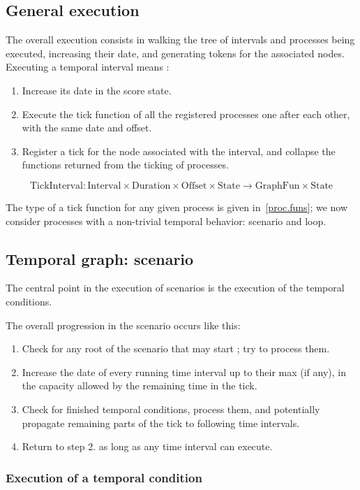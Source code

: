 \documentclass[applsci,article,submit,moreauthors,pdftex,10pt,a4paper]{mdpi}
\begin{document}
\subsection{General execution}
The overall execution consists in walking the tree of intervals and processes being executed, increasing their date, and generating tokens for the associated nodes.
Executing a temporal interval means : 

\begin{enumerate}
\item Increase its date in the score state. 
\item Execute the tick function of all the registered processes one after each other, with the same date and offset.
\item Register a tick for the node associated with the interval, and collapse the functions returned from the ticking of processes.
\end{enumerate}
\[
\mathrm{TickInterval}: \mathrm{Interval} \times \mathrm{Duration} \times \mathrm{Offset} \times \mathrm{State} \rightarrow \mathrm{GraphFun} \times \mathrm{State}
\]

The type of a tick function for any given process is given in~\ref{proc.funs}; we now consider processes with a non-trivial temporal behavior: scenario and loop.

\subsection{Temporal graph: scenario}\label{sec.scenario}
The central point in the execution of scenarios is the execution of the temporal conditions. 

The overall progression in the scenario occurs like this: 

\begin{enumerate}
\item Check for any root of the scenario that may start ; try to process them.
\item Increase the date of every running time interval up to their max (if any), in the capacity allowed by the remaining time in the tick.
\item Check for finished temporal conditions, process them, and potentially propagate remaining parts of the tick to following time intervals.
\item Return to step 2. as long as any time interval can execute.
\end{enumerate}
\subsubsection{Execution of a temporal condition}
\end{document}
